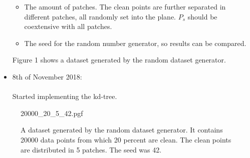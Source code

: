 \documentclass[12pt]{article}
\begin{document}
\begin{itemize}
\begin{itemize}
        \item The amount of patches. The clean points are
              further separated in different patches, all
              randomly set into the plane. $P_s$ should be
              coextensive with all patches.

        \item The seed for the random number generator, so
              results can be compared.

      \end{itemize}
    Figure 1 shows a dataset generated by the random
    dataset generator.

  \item 8th of November 2018: \\ \\
    Started implementing the kd-tree.

\end{itemize}

\begin{figure}
  \begin{center}
    {20000_20_5_42.pgf}
  \end{center}
  \caption{A dataset generated by the random dataset
        generator. It contains 20000 data points from which
        20 percent are clean. The clean points are
        distributed in 5 patches. The seed was 42.}
\end{figure}


\end{document}

